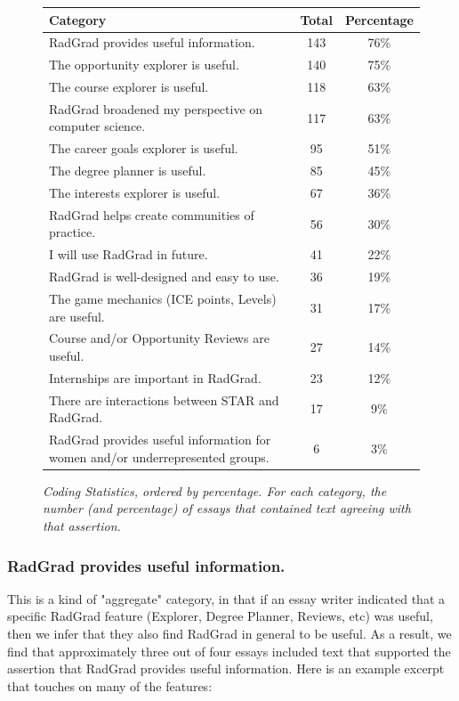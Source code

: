 \documentclass[acmsmall]{acmart}
\begin{document}
\begin{figure}[th]
\centering
\small
\begin{tabular}{ p{4in} c c }
\hline
 Category &  Total & Percentage   \\
\hline
RadGrad provides useful information.                  & 143 & 76\% \\
The opportunity explorer is useful.                   & 140 & 75\% \\
The course explorer is useful.                        & 118 & 63\% \\
RadGrad broadened my perspective on computer science. & 117 & 63\% \\
The career goals explorer is useful.                  & 95 & 51\% \\
The degree planner is useful.                         & 85 & 45\% \\
The interests explorer is useful.                     & 67 & 36\% \\
RadGrad helps create communities of practice.         & 56 & 30\% \\
I will use RadGrad in future.                         & 41 & 22\% \\
RadGrad is well-designed and easy to use.             & 36 & 19\% \\
The game mechanics (ICE points, Levels) are useful.   & 31 & 17\% \\
Course and/or Opportunity Reviews are useful.         & 27 & 14\% \\
Internships are important in RadGrad.                 & 23 & 12\% \\
There are interactions between STAR and RadGrad.      & 17 & 9\% \\
RadGrad provides useful information
for women and/or underrepresented groups.             & 6 & 3\% \\
\hline
\end{tabular}
\caption{\em Coding Statistics, ordered by percentage. For each category, the number (and percentage) of essays that contained text agreeing with that assertion.}
\normalsize
\label{fig:coding-stats}
\end{figure}

\subsubsection{RadGrad provides useful information.} This is a kind of "aggregate" category, in that if an essay writer indicated that a specific RadGrad feature (Explorer, Degree Planner, Reviews, etc) was useful, then we infer that they also find RadGrad in general to be useful. As a result, we find that approximately three out of four essays included text that supported the assertion that RadGrad provides useful information. Here is an example excerpt that touches on many of the features:
\end{document}
